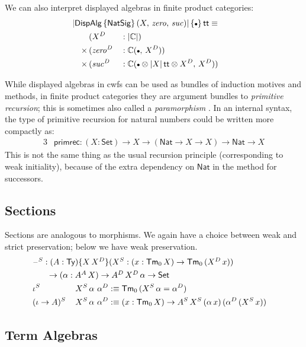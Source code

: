 \documentclass[12pt,a4paper,twoside,openany]{book}
\theoremstyle{remark}
\theoremstyle{definition}
\theoremstyle{theorem}
\newcommand{\mi}[1]{\mathit{#1}}
\newcommand{\ms}[1]{\mathsf{#1}}
\newcommand{\mbb}[1]{\mathbb{#1}}
\newcommand{\Tm}{\mathsf{Tm}}
\newcommand{\Ty}{\mathsf{Ty}}
\renewcommand{\tt}{\mathsf{tt}}
\newcommand{\blank}{\mathord{\hspace{1pt}\text{--}\hspace{1pt}}}
\newcommand{\Set}{\mathsf{Set}}
\newcommand{\emptycon}{\scaleobj{.75}\bullet}
\newcommand{\DispAlg}{\ms{DispAlg}}
\newcommand{\Nat}{\ms{Nat}}
\newcommand{\mbbC}{\mbb{C}}
\newcommand{\defn}{:\equiv}
\begin{document}
We can also interpret displayed algebras in finite product categories:
\begin{alignat*}{3}
  & \hspace{-2em}\rlap{$|\DispAlg\,\{\ms{NatSig}\}\,(X,\,\mi{zero},\,\mi{suc})|\,\{\emptycon\}\,\tt \equiv$}\\
              & (X^D &&: |\mbbC|)\\
      \times\,& (\mi{zero^D} &&: \mbbC(\emptycon,\,X^D))\\
      \times\,& (\mi{suc^D} &&: \mbbC(\emptycon \otimes |X|\,\tt \otimes X^D,\, X^D))
\end{alignat*}

While displayed algebras in cwfs can be used as bundles of induction motives and
methods, in finite product categories they are argument bundles to
\emph{primitive recursion}; this is sometimes also called a
\emph{paramorphism} \cite{bananas}. In an internal syntax, the type of primitive
recursion for natural numbers could be written more compactly as:
\begin{alignat*}{3}
  & \ms{primrec} : (X : \Set) \to X \to (\Nat \to X \to X) \to \Nat \to X
\end{alignat*}
This is not the same thing as the usual recursion principle (corresponding to
weak initiality), because of the extra dependency on $\Nat$ in the method for
successors.

\subsection{Sections}
Sections are analogous to morphisms. We again have a choice between weak and
strict preservation; below we have weak preservation.
\begin{alignat*}{3}
  & \rlap{$\blank^S : (A : \Ty)\{X\,X^D\}(X^S : (x : \Tm_0\,X)\to \Tm_0\,(X^D\,x))$}\\
  & \hspace{2em}\rlap{$\to (\alpha : A^A\,X) \to A^D\,X^D\,\alpha \to \Set$}\\
  & \iota^S\,&&X^S\,\alpha\,\,\alpha^D \defn \Tm_0\,(X^S\,\alpha = \alpha^D) \\
  & (\iota\to A)^S\,&&X^S\,\alpha\,\,\alpha^D \defn
  (x : \Tm_0\,X) \to A^S\,X^S\,(\alpha\,x)\,(\alpha^D\,(X^S\,x))
\end{alignat*}

\subsection{Term Algebras}
\label{sec:simple-2ltt-term-algebras}
\end{document}
